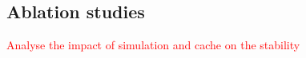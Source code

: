 \subsection{Ablation studies}
\textcolor{red}{Analyse the impact of simulation and cache on the stability}